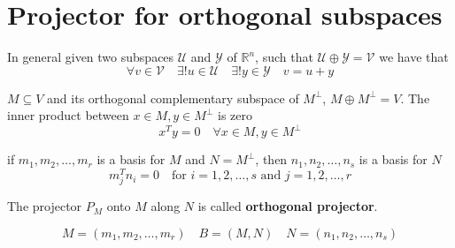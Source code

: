 \chapter{Projector for orthogonal subspaces}
In general given two subspaces \( \mathcal{U} \) and \( \mathcal{Y} \) of \( \mathbb{R}^n \),
such that \( \mathcal{U} \oplus \mathcal{Y} = \mathcal{V} \) we have that
$$ \forall v \in \mathcal{V} \quad \exists! u \in \mathcal{U} \quad \exists! y \in \mathcal{Y} \quad v = u + y $$



$M \subseteq V$ and its orthogonal complementary subspace of $M^{\perp}$, $M \oplus M^{\perp} = V$.
The inner product between $x \in M, y \in M^{\perp}$ is zero
$$x^Ty = 0 \quad \forall x \in M, y \in M^{\perp}$$

if $m_1, m_2, \ldots, m_r$ is a basis for $M$ and $N=M^{\perp}$, then $n_1, n_2, \ldots, n_s$ is a basis for $N$
$$ m_j^Tn_i = 0 \quad \text{for } i=1,2,\ldots,s \text{ and } j=1,2,\ldots,r $$

The projector $P_M$ onto $M$ along $N$ is called \textbf{orthogonal projector}.

$$
M = (m_1, m_2, \ldots, m_r) \quad B = (M, N) \quad N = (n_1, n_2, \ldots, n_s)
$$

